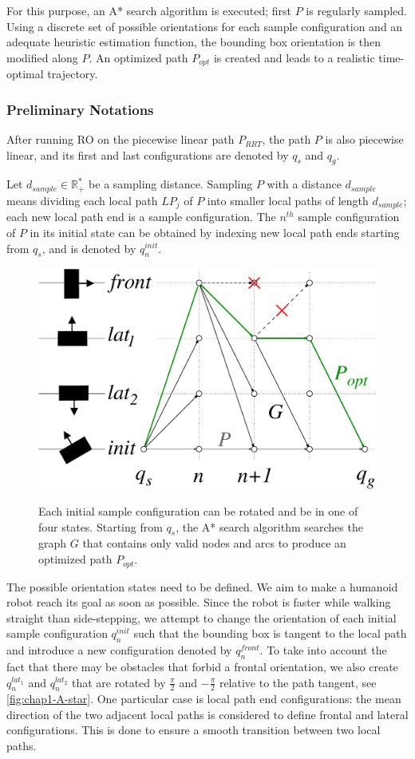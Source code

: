 For this purpose, an A* search algorithm is executed; first $P$ is
regularly sampled. Using a discrete set of possible orientations for
each sample configuration and an adequate heuristic estimation
function, the bounding box orientation is then modified along $P$. An
optimized path $P_{opt}$ is created and leads to a realistic
time-optimal trajectory.

\subsubsection{Preliminary Notations}
After running RO on the piecewise linear path $P_{RRT}$, the
path $P$ is also piecewise linear, and its first and last
configurations are denoted by $q_s$ and $q_g$.

Let $d_{sample} \in \mathbb{R}_+^*$ be a sampling distance. Sampling
$P$ with a distance $d_{sample}$ means dividing each local path $LP_j$
of $P$ into smaller local paths of length $d_{sample}$; each new local
path end is a sample configuration. The $n^{th}$ sample configuration
of $P$ in its initial state can be obtained by indexing new local path
ends starting from $q_s$, and is denoted by $q_n^{init}$.

\begin{figure}
  \centering
      {\includegraphics[width = 0.75\linewidth]
        {src/chap1-path-optimization/A-star.pdf}}
      \caption{Each initial sample configuration can be rotated and be
        in one of four states. Starting from $q_s$, the A* search
        algorithm searches the graph $G$ that contains only valid
        nodes and arcs to produce an optimized path $P_{opt}$.}
      \label{fig:chap1-A-star}
\end{figure}

The possible orientation states need to be defined. We aim to make a
humanoid robot reach its goal as soon as possible. Since the robot is
faster while walking straight than side-stepping, we attempt to change
the orientation of each initial sample configuration $q_n^{init}$ such
that the bounding box is tangent to the local path and introduce a new
configuration denoted by $q_n^{front}$. To take into account the fact
that there may be obstacles that forbid a frontal orientation, we also
create $q_n^{lat_1}$ and $q_n^{lat_2}$ that are rotated by
$\frac{\pi}{2}$ and $-\frac{\pi}{2}$ relative to the path tangent, see
\autoref{fig:chap1-A-star}. One particular case is local path end
configurations: the mean direction of the two adjacent local paths is
considered to define frontal and lateral configurations. This is done
to ensure a smooth transition between two local paths.

